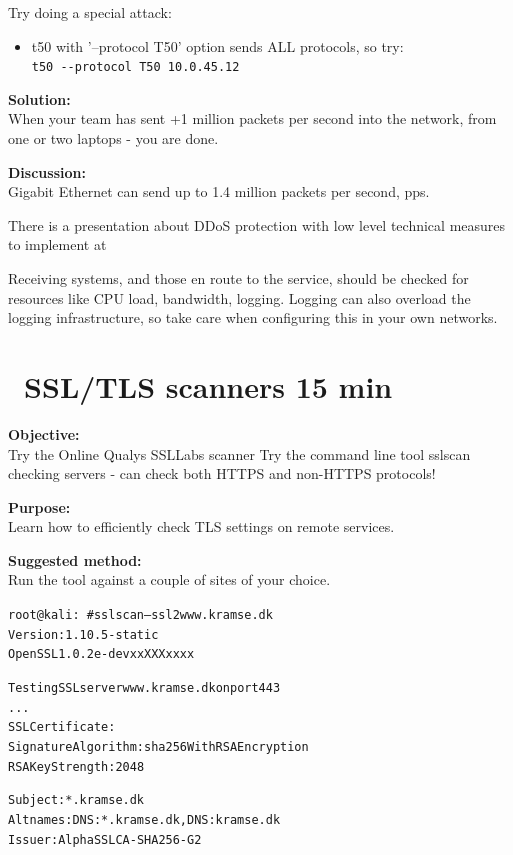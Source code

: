 \documentclass[a4paper,11pt,notitlepage]{report}
\begin{document}
Try doing a special attack:
\begin{itemize}
\item t50 with '--protocol T50' option sends ALL protocols, so try:\\
\verb+t50 --protocol T50 10.0.45.12+
\end{itemize}


{\bf Solution:}\\
When your team has sent +1 million packets per second into the network, from one or two laptops - you are done.

{\bf Discussion:}\\
Gigabit Ethernet can send up to 1.4 million packets per second, pps.

There is a presentation about DDoS protection with low level technical measures to implement at\\
{\footnotesize {}}

Receiving systems, and those en route to the service, should be checked for resources like CPU load, bandwidth, logging. Logging can also overload the logging infrastructure, so take care when configuring this in your own networks.





\chapter{\faInfoCircle\ SSL/TLS scanners 15 min}
\label{ex:SSLScanner}

{\bf Objective:}\\
Try the Online Qualys SSLLabs scanner 
Try the command line tool sslscan checking servers - can check both HTTPS and non-HTTPS protocols!

{\bf Purpose:}\\
Learn how to efficiently check TLS settings on remote services.

{\bf Suggested method:}\\
Run the tool against a couple of sites of your choice.

\begin{alltt}\footnotesize
root@kali:~# sslscan --ssl2 www.kramse.dk
Version: 1.10.5-static
OpenSSL 1.0.2e-dev xx XXX xxxx

Testing SSL server www.kramse.dk on port 443
...
  SSL Certificate:
Signature Algorithm: sha256WithRSAEncryption
RSA Key Strength:    2048

Subject:  *.kramse.dk
Altnames: DNS:*.kramse.dk, DNS:kramse.dk
Issuer:   AlphaSSL CA - SHA256 - G2
\end{alltt}
\end{document}
